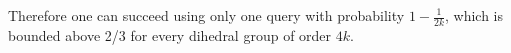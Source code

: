 Therefore one can succeed using only one query with probability $1 - \frac{1}{2k}$, which is bounded above 2/3 for 
every dihedral group of order $4k$.









